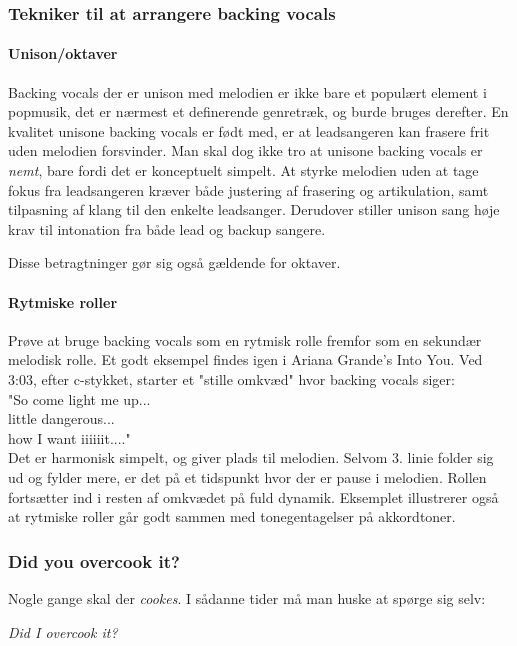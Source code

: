 \subsubsection{Tekniker til at arrangere backing vocals}
\paragraph{Unison/oktaver}
Backing vocals der er unison med melodien er ikke bare et populært element i popmusik, det er nærmest et definerende genretræk, og burde bruges derefter.
En kvalitet unisone backing vocals er født med, er at leadsangeren kan frasere frit uden melodien forsvinder.
Man skal dog ikke tro at unisone backing vocals er \textit{nemt}, bare fordi det er konceptuelt simpelt.
At styrke melodien uden at tage fokus fra leadsangeren kræver både justering af frasering og artikulation, samt tilpasning af klang til den enkelte leadsanger.
Derudover stiller unison sang høje krav til intonation fra både lead og backup sangere.

Disse betragtninger gør sig også gældende for oktaver.

\paragraph{Rytmiske roller}
Prøve at bruge backing vocals som en rytmisk rolle fremfor som en sekundær melodisk rolle.
Et godt eksempel findes igen i Ariana Grande's Into You. Ved 3:03, efter c-stykket, starter et "stille omkvæd" hvor backing vocals siger:\\
\hspace*{1cm}    "So come light me up...\\
\hspace*{1cm}    little dangerous...\\
\hspace*{1cm}    how I want iiiiiit...."\\
Det er harmonisk simpelt, og giver plads til melodien. Selvom 3. linie folder sig ud og fylder mere, er det på et tidspunkt hvor der er pause i melodien.
Rollen fortsætter ind i resten af omkvædet på fuld dynamik.
Eksemplet illustrerer også at rytmiske roller går godt sammen med tonegentagelser på akkordtoner.

\subsubsection{Did you overcook it?}
Nogle gange skal der \textit{cookes}. I sådanne tider må man huske at spørge sig selv:

\textit{Did I overcook it?}